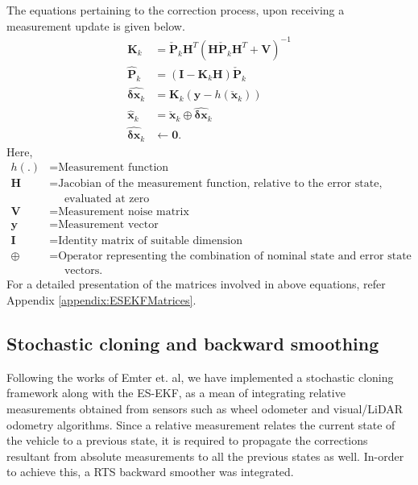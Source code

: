 The equations pertaining to the correction process, upon receiving a measurement update is given below.
\begin{align}
    \textbf{K}_k &= \check{\textbf{P}}_k\textbf{H}^T\left(\textbf{H}\check{\textbf{P}}_k\textbf{H}^T+\textbf{V}\right)^{-1} \\
    \hat{\textbf{P}}_k &= \left(\textbf{I}-\textbf{K}_k\textbf{H}\right)\check{\textbf{P}}_k\\
	\hat{\boldsymbol{\delta}\textbf{x}_k} &= \textbf{K}_k \left(\textbf{y}-h\left(\check{\textbf{x}}_k\right)\right)\\
	\hat{\textbf{x}}_k &= \check{\textbf{x}}_k \oplus \hat{\boldsymbol{\delta}\textbf{x}}_k\\
	\hat{\boldsymbol{\delta}\textbf{x}}_k & \leftarrow \textbf{0}.
\end{align}
Here,
\begin{align}
	h(.) &= \text{Measurement function}\\
	\textbf{H} &= \text{Jacobian of the measurement function, relative to the error state,}\nonumber\\
	&\quad\text{ evaluated at zero}\\
	\textbf{V} &= \text{Measurement noise matrix}\\
	\textbf{y} &= \text{Measurement vector}\\
	\textbf{I} &= \text{Identity matrix of suitable dimension}\\
	\oplus &= \text{Operator representing the combination of nominal state and error state }\nonumber\\
	&\quad\text{ vectors}.
\end{align}
For a detailed presentation of the matrices involved in above equations, refer Appendix \ref{appendix:ESEKFMatrices}\cite{pa:Sola2017QuaternionKinematics}.


\subsection{Stochastic cloning and backward smoothing}
Following the works of Emter et. al\cite{pa:Emter2018StochasticCloning},  we have implemented a stochastic cloning framework along with the \gls{ES-EKF}, as a mean of integrating relative measurements obtained from sensors such as wheel odometer and visual/\gls{LiDAR} odometry algorithms. Since a relative measurement relates the current state of the vehicle to a previous state, it is required to propagate the corrections resultant from absolute measurements to all the previous states as well. In-order to achieve this, a \gls{RTS} backward smoother was integrated.


